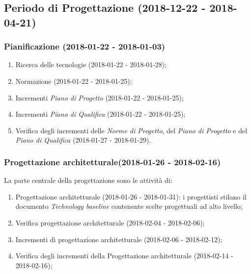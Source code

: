 	\newpage
	\subsection{Periodo di Progettazione (2018-12-22 - 2018-04-21)}	
		\subsubsection{Pianificazione (2018-01-22 - 2018-01-03)\\} 
			\begin{enumerate}[label = 3.1.\arabic*)]
				\item Ricerca delle tecnologie (2018-01-22 - 2018-01-28);
				\item Normazione (2018-01-22 - 2018-01-25);
				\item Incrementi \textit{Piano di Progetto} (2018-01-22 - 2018-01-25);
				\item Incrementi \textit{Piano di Qualifica} (2018-01-22 - 2018-01-25);
				\item Verifica degli incrementi delle \textit{Norme di Progetto}, del \textit{Piano di Progetto} e del \textit{Piano di Qualifica} (2018-01-27 - 2018-01-29).
			\end{enumerate}
	
		\subsubsection{Progettazione architetturale(2018-01-26 - 2018-02-16)\\} La parte centrale della progettazione sono le attività di:
			\begin{enumerate}[label = 3.2.\arabic*)]
				\item Progettazione architetturale (2018-01-26 - 2018-01-31): i progettisti stilano il documento \textit{Technology baseline} contenente scelte progettuali ad alto livello;
				\item Verifica progettazione architetturale (2018-02-04 - 2018-02-06);
				\item Incrementi di progettazione architetturale (2018-02-06 - 2018-02-12);
				\item Verifica degli incrementi della Progettazione architetturale (2018-02-14 - 2018-02-16);
			\end{enumerate}

